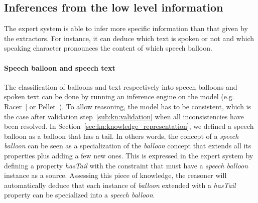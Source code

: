 \subsection{Inferences from the low level information} %
\label{sub:inference_from_low_level}

The expert system is able to infer more specific information than that given by the extractors.
For instance, it can deduce which text is spoken or not and which speaking character pronounces the content of which speech balloon.






\paragraph{Speech balloon and speech text} %
\label{par:speech_balloon_and_speech_text}

The classification of balloons and text respectively into speech balloons and spoken text can be done by running an inference engine on the model (e.g. Racer~\cite{Haarslev2012}] or Pellet~\cite{Sirin2007a}).
To allow reasoning, the model has to be consistent, which is the case after validation step~\ref{sub:kn:validation} when all inconsistencies have been resolved.
In Section~\ref{sec:kn:knowledge_representation}, we defined a speech balloon as a balloon that has a tail.
In others words, the concept of a \textit{speech balloon} can be seen as a specialization of the \textit{balloon} concept that extends all its properties plus adding a few new ones.
This is expressed in the expert system by defining a property \textit{hasTail} with the constraint that must have a \textit{speech balloon} instance as a source.
Assessing this piece of knowledge, the reasoner will automatically deduce that each instance of \textit{balloon} extended with a \textit{hasTail} property can be specialized into a \textit{speech balloon}.


